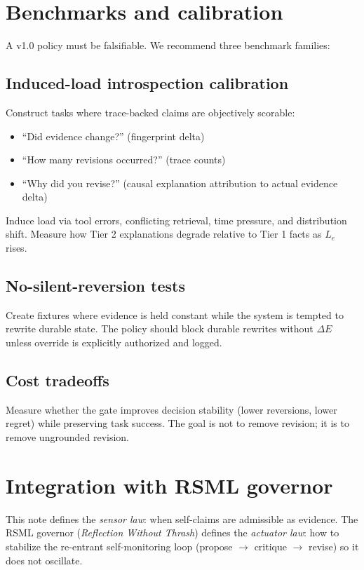 \documentclass[11pt]{article}
\begin{document}
\section{Benchmarks and calibration}
A v1.0 policy must be falsifiable. We recommend three benchmark families:

\subsection{Induced-load introspection calibration}
Construct tasks where trace-backed claims are objectively scorable:
\begin{itemize}
  \item \enquote{Did evidence change?} (fingerprint delta)
  \item \enquote{How many revisions occurred?} (trace counts)
  \item \enquote{Why did you revise?} (causal explanation attribution to actual evidence delta)
\end{itemize}
Induce load via tool errors, conflicting retrieval, time pressure, and distribution shift. Measure how Tier 2
explanations degrade relative to Tier 1 facts as $L_e$ rises.

\subsection{No-silent-reversion tests}
Create fixtures where evidence is held constant while the system is tempted to rewrite durable state. The
policy should block durable rewrites without $\Delta E$ unless override is explicitly authorized and logged.

\subsection{Cost tradeoffs}
Measure whether the gate improves decision stability (lower reversions, lower regret) while preserving task
success. The goal is not to remove revision; it is to remove ungrounded revision.

\section{Integration with RSML governor}
This note defines the \emph{sensor law}: when self-claims are admissible as evidence. The RSML governor
(\emph{Reflection Without Thrash}) defines the \emph{actuator law}: how to stabilize the re-entrant
self-monitoring loop (propose $\rightarrow$ critique $\rightarrow$ revise) so it does not oscillate.
\end{document}

